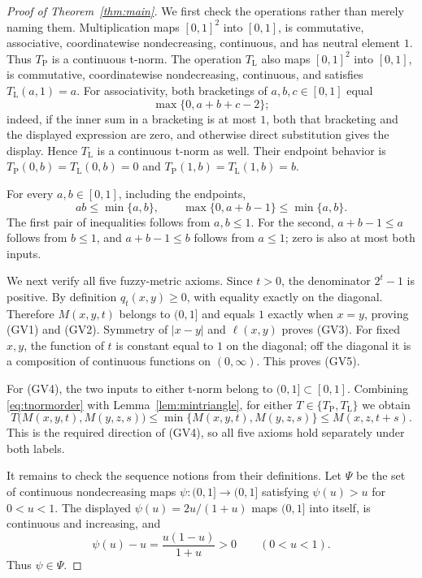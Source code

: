 \documentclass[11pt]{article}
\newcommand{\TP}{T_{\mathrm P}}
\newcommand{\TL}{T_{\mathrm L}}
\begin{document}
\begin{proof}[Proof of Theorem~\ref{thm:main}]
We first check the operations rather than merely naming them.  Multiplication
maps $[0,1]^2$ into $[0,1]$, is commutative, associative, coordinatewise
nondecreasing, continuous, and has neutral element $1$.  Thus $\TP$ is a
continuous t-norm.  The operation $\TL$ also maps $[0,1]^2$ into $[0,1]$,
is commutative, coordinatewise nondecreasing, continuous, and satisfies
$\TL(a,1)=a$.  For associativity, both bracketings of $a,b,c\in[0,1]$
equal
\[
 \max\{0,a+b+c-2\};
\]
indeed, if the inner sum in a bracketing is at most $1$, both that
bracketing and the displayed expression are zero, and otherwise direct
substitution gives the display.  Hence $\TL$ is a continuous t-norm as well.
Their endpoint behavior is $\TP(0,b)=\TL(0,b)=0$ and
$\TP(1,b)=\TL(1,b)=b$.

For every $a,b\in[0,1]$, including the endpoints,
\begin{equation}\label{eq:tnormorder}
 ab\le\min\{a,b\},
 \qquad
 \max\{0,a+b-1\}\le\min\{a,b\}.
\end{equation}
The first pair of inequalities follows from $a,b\le1$.  For the second,
$a+b-1\le a$ follows from $b\le1$, and $a+b-1\le b$ follows from
$a\le1$; zero is also at most both inputs.

We next verify all five fuzzy-metric axioms.  Since $t>0$, the denominator
$2^t-1$ is positive.  By definition $q_t(x,y)\ge0$, with equality exactly
on the diagonal.  Therefore $M(x,y,t)$ belongs to $(0,1]$ and equals $1$
exactly when $x=y$, proving (GV1) and (GV2).  Symmetry of $|x-y|$ and
$\ell(x,y)$ proves (GV3).  For fixed $x,y$, the function of $t$ is constant
equal to $1$ on the diagonal; off the diagonal it is a composition of
continuous functions on $(0,\infty)$.  This proves (GV5).

For (GV4), the two inputs to either t-norm belong to $(0,1]\subset[0,1]$.
Combining \eqref{eq:tnormorder} with Lemma~\ref{lem:mintriangle}, for either
$T\in\{\TP,\TL\}$ we obtain
\[
 T\bigl(M(x,y,t),M(y,z,s)\bigr)
 \le \min\{M(x,y,t),M(y,z,s)\}
 \le M(x,z,t+s).
\]
This is the required direction of (GV4), so all five axioms hold separately
under both labels.

It remains to check the sequence notions from their definitions.  Let
$\Psi$ be the set of continuous nondecreasing maps
$\psi:(0,1]\to(0,1]$ satisfying $\psi(u)>u$ for $0<u<1$.  The displayed
$\psi(u)=2u/(1+u)$ maps $(0,1]$ into itself, is continuous and increasing,
and
\[
 \psi(u)-u=\frac{u(1-u)}{1+u}>0\qquad(0<u<1).
\]
Thus $\psi\in\Psi$.


\end{proof}
\end{document}
